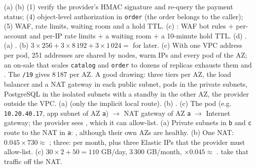  (a)  (b) (1) verify the provider's HMAC signature and re-query the payment status; (4) object-level authorization in \texttt{order} (the order belongs to the caller); (5) WAF, rate limits, waiting room and a hold TTL. (c) : WAF bot rules $+$ per-account and per-IP rate limits $+$ a waiting room $+$ a 10-minute hold TTL. (d) .
 (a) . (b) $3 \times 256 + 3 \times 8\,192 + 3 \times 1\,024 =$  for later. (c) With one VPC address per pod, 251 addresses are shared by nodes, warm IPs and every pod of the AZ; an on-sale that scales \texttt{catalog} and \texttt{order} to dozens of replicas exhausts them and . The \texttt{/19} gives 8\,187 per AZ.
 A good drawing: three tiers per AZ, the load balancer and a NAT gateway in each public subnet, pods in the private subnets, PostgreSQL in the isolated subnets with a standby in the other AZ, the provider outside the VPC. (a)  (only the implicit local route). (b) . (c) The pod (e.g. \texttt{10.20.40.17}, app subnet of AZ \texttt{a}) $\to$ NAT gateway of AZ \texttt{a} $\to$ Internet gateway; the provider sees , which it can allow-list.
 (a) Private subnets in \texttt{b} and \texttt{c} route to the NAT in \texttt{a}: , although their own AZs are healthy. (b) One NAT: $0.045 \times 730 \approx$ ; three:  per month, plus three Elastic IPs that the provider must allow-list. (c) $30 \times 2 + 50 = 110$ GB/day, 3\,300 GB/month, $\times 0.045 \approx$ .  take that traffic off the NAT.
